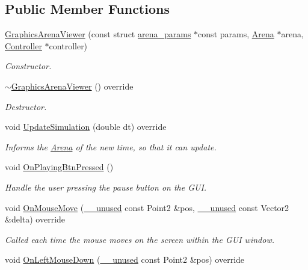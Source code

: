 \subsection*{Public Member Functions}
\begin{DoxyCompactItemize}
\item 
\hyperlink{classGraphicsArenaViewer_a869510833897508300da65b1eb0c5d09}{Graphics\+Arena\+Viewer} (const struct \hyperlink{structarena__params}{arena\+\_\+params} $\ast$const params, \hyperlink{classArena}{Arena} $\ast$arena, \hyperlink{classController}{Controller} $\ast$controller)
\begin{DoxyCompactList}\small\item\em Constructor. \end{DoxyCompactList}\item 
\hyperlink{classGraphicsArenaViewer_a88cea02aab1550a7f315fbf4f3868109}{$\sim$\+Graphics\+Arena\+Viewer} () override
\begin{DoxyCompactList}\small\item\em Destructor. \end{DoxyCompactList}\item 
void \hyperlink{classGraphicsArenaViewer_aeec66666382aa0312574d70aa58de250}{Update\+Simulation} (double dt) override
\begin{DoxyCompactList}\small\item\em Informs the \hyperlink{classArena}{Arena} of the new time, so that it can update. \end{DoxyCompactList}\item 
void \hyperlink{classGraphicsArenaViewer_a7cc65fd0e2e8c1f6138608e398c7c887}{On\+Playing\+Btn\+Pressed} ()
\begin{DoxyCompactList}\small\item\em Handle the user pressing the pause button on the G\+UI. \end{DoxyCompactList}\item 
void \hyperlink{classGraphicsArenaViewer_a74b5c524369a62ba419c89677c646d9e}{On\+Mouse\+Move} (\hyperlink{common_8h_a2e3484535ee610c8e19e9859563abe48}{\+\_\+\+\_\+unused} const Point2 \&pos, \hyperlink{common_8h_a2e3484535ee610c8e19e9859563abe48}{\+\_\+\+\_\+unused} const Vector2 \&delta) override
\begin{DoxyCompactList}\small\item\em Called each time the mouse moves on the screen within the G\+UI window. \end{DoxyCompactList}\item 
void \hyperlink{classGraphicsArenaViewer_adf2fb01c3ca8b1774f031d68616b288c}{On\+Left\+Mouse\+Down} (\hyperlink{common_8h_a2e3484535ee610c8e19e9859563abe48}{\+\_\+\+\_\+unused} const Point2 \&pos) override

\end{DoxyCompactItemize}
